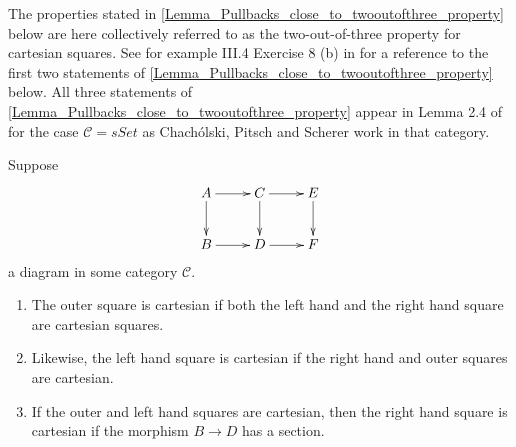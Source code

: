 The properties stated in \cref{Lemma_Pullbacks_close_to_twooutofthree_property} below are here collectively referred to as the two-out-of-three property for cartesian squares. See for example III.4 Exercise 8 (b) in \cite{ML98} for a reference to the first two statements of \cref{Lemma_Pullbacks_close_to_twooutofthree_property} below. All three statements of \cref{Lemma_Pullbacks_close_to_twooutofthree_property} appear in Lemma 2.4 of \cite[p.~57]{CPS06} for the case $\mathscr{C} =sSet$ as Chachólski, Pitsch and Scherer work in that category.
\begin{lemma}
\label{Lemma_Pullbacks_close_to_twooutofthree_property}
Suppose
\begin{displaymath}
\xymatrix{
A \ar[d] \ar[r] & C \ar[d] \ar[r] & E \ar[d] \\
B \ar[r] & D \ar[r] & F
}
\end{displaymath}
a diagram in some category $\mathscr{C}$.
\begin{enumerate}
\item{The outer square is cartesian if both the left hand and the right hand square are cartesian squares.}
\item{Likewise, the left hand square is cartesian if the right hand and outer squares are cartesian.}
\item{If the outer and left hand squares are cartesian, then the right hand square is cartesian if the morphism $B\to D$ has a section.}
\end{enumerate}
\end{lemma}
